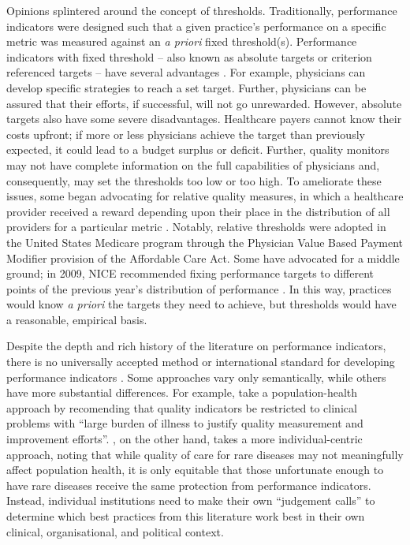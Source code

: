\documentclass[12pt]{article}
\begin{document}
Opinions splintered around the concept of thresholds. Traditionally, performance indicators were designed such that a given practice's performance on a specific metric was measured against an \emph{a priori} fixed threshold(s). Performance indicators with fixed threshold -- also known as absolute targets or criterion referenced targets -- have several advantages \citep{doranSettingPerformanceTargets2014}. For example, physicians can develop specific strategies to reach a set target. Further, physicians can be assured that their efforts, if successful, will not go unrewarded. However, absolute targets also have some severe disadvantages. Healthcare payers cannot know their costs upfront; if more or less physicians achieve the target than previously expected, it could lead to a budget surplus or deficit. Further, quality monitors may not have complete information on the full capabilities of physicians and, consequently, may set the thresholds too low or too high. To ameliorate these issues, some began advocating for relative quality measures, in which a healthcare provider received a reward depending upon their place in the distribution of all providers for a particular metric \citep{chienMedicarePhysicianValueBased2013}. Notably, relative thresholds were adopted in the United States Medicare program through the Physician Value Based Payment Modifier provision of the Affordable Care Act. Some have advocated for a middle ground; in 2009, NICE recommended fixing performance targets to different points of the previous year's distribution of performance \citep{doranSettingPerformanceTargets2014}. In this way, practices would know \emph{a priori} the targets they need to achieve, but thresholds would have a reasonable, empirical basis.

Despite the depth and rich history of the literature on performance indicators, there is no universally accepted method or international standard for developing performance indicators \citep{shekelleQualityIndicatorsPerformance2013,stelfoxMeasuringQualityCare2013}. Some approaches vary only semantically, while others have more substantial differences. For example, \citet{stelfoxMeasuringQualityCare2013} take a population-health approach by recomending that quality indicators be restricted to clinical problems with ``large burden of illness to justify quality measurement and improvement efforts''. \citet{shekelleQualityIndicatorsPerformance2013}, on the other hand, takes a more individual-centric approach, noting that while quality of care for rare diseases may not meaningfully affect population health, it is only equitable that those unfortunate enough to have rare diseases receive the same protection from performance indicators. Instead, individual institutions need to make their own ``judgement calls'' to determine which best practices from this literature work best in their own clinical, organisational, and political context.
\end{document}
